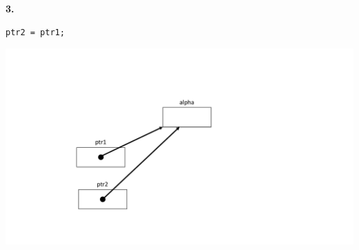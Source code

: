 \Large{\textbf{3.}}\normalsize\\
\noindent
\begin{minipage}{0.3\linewidth}
\begin{lstlisting}
ptr2 = ptr1;
\end{lstlisting}
\end{minipage}
\hspace{0.01\linewidth}
\begin{minipage}{0.4\linewidth}
	\centering
	\includegraphics[width=\linewidth]{images/pointer6.pdf}
\end{minipage}

